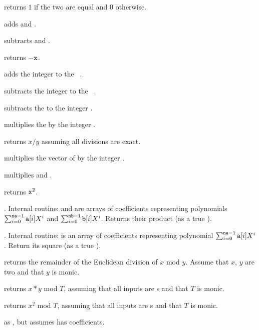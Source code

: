  returns $1$ if the two  are equal
and $0$ otherwise.

 adds  and .

 subtracts  and .

 returns $-{\tt x}$.

 adds the integer  to the
~.

 subtracts the integer  to the
~.

 subtracts the   to the
integer .

 multiplies the   by the integer .

 returns $x/y$ assuming all divisions
are exact.

 multiplies the vector of  
by the integer .

 multiplies  and .

 returns ${\tt x}^2$.

. Internal routine:
 and  are arrays of coefficients representing polynomials
$\sum_{i = 0}^{{\tt na-1}} {\tt a}[i] X^i$ and
$\sum_{i = 0}^{{\tt nb-1}} {\tt b}[i] X^i$. Returns their product (as a true
).

. Internal routine:
 is an array of coefficients representing polynomial
$\sum_{i = 0}^{{\tt na-1}} {\tt a}[i] X^i$. Return its square (as a true
).

 returns the remainder of the Euclidean
division of $x$ mod $y$. Assume that $x$, $y$ are two  and that
$y$ is monic.

 returns $x*y$ mod $T$, assuming
that all inputs are s and that $T$ is monic.

 returns $x^2$ mod $T$, assuming
that all inputs are s and that $T$ is monic.

 as , but assumes
 has  coefficients.

